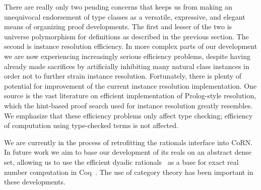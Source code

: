 \documentclass[a4paper,10pt,runningheads]{llncs}
\begin{document}


There are really only two pending concerns that keeps us from making an unequivocal endorsement of type classes as a versatile, expressive, and elegant means of organizing proof developments. The first and lesser of the two is universe polymorphism for definitions as described in the previous section. The second is instance resolution efficiency. In more complex parts of our development we are now experiencing increasingly serious efficiency problems, despite having already made sacrifices by artificially inhibiting many natural class instances in order not to further strain instance resolution.
Fortunately, there is plenty of potential for improvement of the current instance resolution implementation. One source is the vast literature on efficient implementation of Prolog-style resolution, which the hint-based proof search used for instance resolution greatly resembles. We emphasize that these efficiency problems only affect type checking; efficiency of computation using type-checked terms is not affected.


We are currently in the process of retrofitting the rationals interface into CoRN. In future work we aim to base our development of its reals on an abstract dense set, allowing us to use the efficient dyadic rationals~\cite{boldo2009combining} as a base for exact real number computation in Coq~\cite{Oconnor:real,Riemann}. The use of category theory has been important in these developments. %
\end{document}
